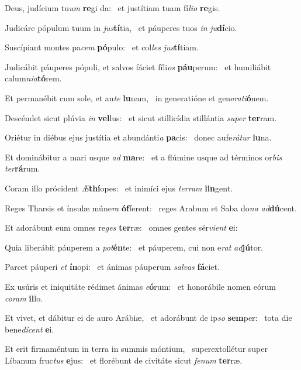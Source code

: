 \item Deus, judícium tu\textit{um} \textbf{re}gi da:~\psstar{} et justítiam tuam fí\textit{lio} \textbf{re}gis.
\item Judicáre pópulum tuum in \textit{jus}\textbf{tí}tia,~\psstar{} et páuperes tuos \textit{in} \textit{ju}\textbf{dí}cio.
\item Suscípiant montes pa\textit{cem} \textbf{pó}pulo:~\psstar{} et col\textit{les} \textit{jus}\textbf{tí}tiam.
\item Judicábit páuperes pópuli, et salvos fáciet fíli\textit{os} \textbf{páu}perum:~\psstar{} et humiliábit calum\textit{nia}\textbf{tó}rem.
\item Et permanébit cum sole, et an\textit{te} \textbf{lu}nam,~\psstar{} in generatióne et gene\textit{rati}\textbf{ó}nem.
\item Descéndet sicut plúvia \textit{in} \textbf{vel}lus:~\psstar{} et sicut stillicídia stillántia \textit{super} \textbf{ter}ram.
\item Oriétur in diébus ejus justítia et abundánti\textit{a} \textbf{pa}cis:~\psstar{} donec aufe\textit{rátur} \textbf{lu}na.
\item Et dominábitur a mari usque \textit{ad} \textbf{ma}re:~\psstar{} et a flúmine usque ad términos or\textit{bis} \textit{ter}\textbf{rá}rum.
\item Coram illo prócident \textit{Æ}\textbf{thí}opes:~\psstar{} et inimíci ejus \textit{terram} \textbf{lin}gent.
\item Reges Tharsis et ínsulæ múne\textit{ra} \textbf{óf}ferent:~\psstar{} reges Arabum et Saba do\textit{na} \textit{ad}\textbf{dú}cent.
\item Et adorábunt eum omnes re\textit{ges} \textbf{ter}ræ:~\psstar{} omnes gentes sér\textit{vient} \textbf{e}i:
\item Quia liberábit páuperem a \textit{pot}\textbf{én}te:~\psstar{} et páuperem, cui non e\textit{rat} \textit{ad}\textbf{jú}tor.
\item Parcet páuperi \textit{et} \textbf{ín}opi:~\psstar{} et ánimas páuperum \textit{salvas} \textbf{fá}ciet.
\item Ex usúris et iniquitáte rédimet ánimas \textit{e}\textbf{ó}rum:~\psstar{} et honorábile nomen eórum \textit{coram} \textbf{il}lo.
\item Et vivet, et dábitur ei de auro Arábiæ,~\pscross{} et adorábunt de ip\textit{so} \textbf{sem}per:~\psstar{} tota die bene\textit{dícent} \textbf{e}i.
\item Et erit firmaméntum in terra in summis móntium,~\pscross{} superextollétur super Líbanum fruc\textit{tus} \textbf{e}jus:~\psstar{} et florébunt de civitáte sicut \textit{fenum} \textbf{ter}ræ.
